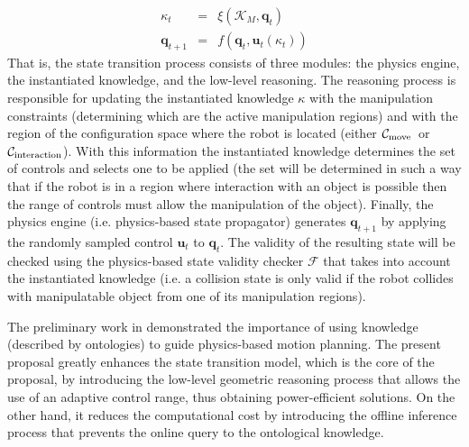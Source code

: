 \documentclass[twocolumn]{svjour3}          %
\newcommand {\comentario}[1] {{\small \color{red}{\bfseries #1}}}
\newcommand {\Cint}{\hbox{{$\cal C_{\textrm{interaction}}$}}}                %
\newcommand {\Cmove}{\hbox{{$\cal C_{\textrm{move}}$}}}                %
\begin{document}
 \begin{eqnarray}\label{eq:state propagator}
	 \kappa_{t} &=& \xi(\mathcal{K}_M, \mathbf{q}_{t})\\
	\mathbf{q}_{t+1} &=& f(\mathbf{q}_t,\mathbf{u}_t(\kappa_{t}))
\end{eqnarray}
That is, the state transition process consists of three modules: the 
physics engine, the instantiated knowledge, and the low-level reasoning. The reasoning process 
is responsible for updating the instantiated knowledge $\kappa$ with the manipulation constraints (determining which are the active manipulation regions) and with the region of the configuration space 
where the robot is located (either \Cmove\ or \Cint). With this information the instantiated knowledge determines the set of controls  and selects one to be applied (the set will be determined in such 
a way that if the robot is in a region where interaction with an object is possible then the range of controls must allow the manipulation of the object). Finally, the physics engine (i.e. 
physics-based state propagator) generates $\mathbf{q}_{t+1}$ by applying the randomly sampled control $\mathbf{u}_t$  to $\mathbf{q}_t$. The validity of the resulting state will be checked using the  
physics-based state validity checker $\mathcal{F}$ that takes into account the instantiated knowledge (i.e. a collision state is only valid if the robot collides with manipulatable object from one of 
its manipulation regions).

 The preliminary work in \cite{muhayyuddin2015} demonstrated the importance of using knowledge (described by ontologies) to guide physics-based motion planning. The  present proposal greatly enhances 
the state transition model, which is the core of the proposal, by introducing the low-level geometric reasoning process that allows the use of an adaptive control range, thus obtaining power-efficient 
solutions. On the other hand, it reduces the computational cost by introducing the offline inference process that prevents the online query to the ontological knowledge.  
 
\end{document}
